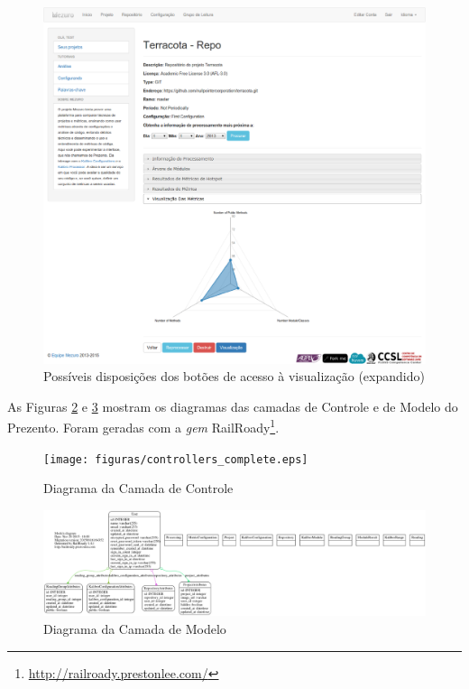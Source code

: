 \begin{figure}[!htb]
	\centering
    \includegraphics[keepaspectratio=true,scale=0.33]
    {figuras/exmplo_disposicao_botao_visualizacao_2.eps}
  \caption{Possíveis disposições dos botões de acesso à visualização (expandido)}
  \label{fig:exmplo_disposicao_botao_visualizacao_2}
\end{figure}

\newpage

As Figuras \ref{fig:controllers_complete} e \ref{fig:models_complete} mostram os
diagramas das camadas de Controle e de Modelo do Prezento. Foram geradas com a
\textit{gem} RailRoady\footnote{\url{http://railroady.prestonlee.com/}}.

\begin{figure}[!htb]
	\centering
    \texttt{[image: figuras/controllers\_complete.eps]}
  \caption{Diagrama da Camada de Controle}
  \label{fig:controllers_complete}
\end{figure}

\begin{figure}[!htb]
	\centering
    \includegraphics[keepaspectratio=true,scale=0.25]
    {figuras/models_complete.eps}
  \caption{Diagrama da Camada de Modelo}
  \label{fig:models_complete}
\end{figure}

